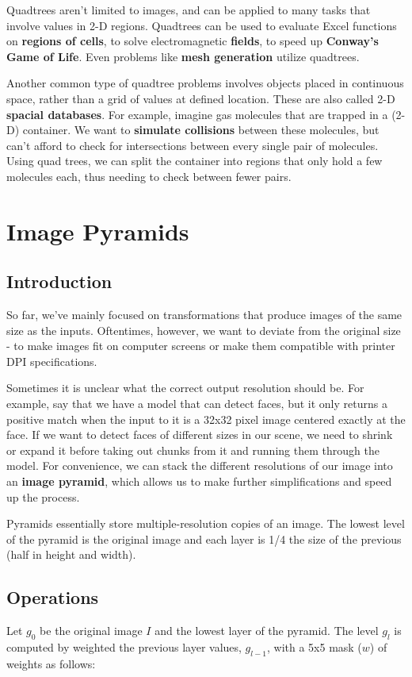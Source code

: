 \documentclass{article}
\begin{document}
Quadtrees aren't limited to images, and can be applied to many tasks that involve values in 2-D regions. Quadtrees can be used to evaluate Excel functions on \textbf{regions of cells}, to solve electromagnetic \textbf{fields}, to speed up \textbf{Conway's Game of Life}. Even problems like \textbf{mesh generation} utilize quadtrees.

Another common type of quadtree problems involves objects placed in continuous space, rather than a grid of values at defined location. These are also called 2-D \textbf{spacial databases}. For example, imagine gas molecules that are trapped in a (2-D) container. We want to \textbf{simulate collisions} between these molecules, but can't afford to check for intersections between every single pair of molecules. Using quad trees, we can split the container into regions that only hold a few molecules each, thus needing to check between fewer pairs.

\section{Image Pyramids}

\subsection{Introduction}

So far, we've mainly focused on transformations that produce images of the same size as the inputs. Oftentimes, however, we want to deviate from the original size - to make images fit on computer screens or make them compatible with printer DPI specifications.

Sometimes it is unclear what the correct output resolution should be. For example, say that we have a model that can detect faces, but it only returns a positive match when the input to it is a 32x32 pixel image centered exactly at the face. If we want to detect faces of different sizes in our scene, we need to shrink or expand it before taking out chunks from it and running them through the model. For convenience, we can stack the different resolutions of our image into an \textbf{image pyramid}, which allows us to make further simplifications and speed up the process.

Pyramids essentially store multiple-resolution copies of an image.  The lowest level of the pyramid is the original image and each layer is 1/4 the size of the previous (half in height and width). 

\subsection{Operations}
Let $g_0$ be the original image $I$ and the lowest layer of the pyramid.  The level $g_l$ is computed by weighted the previous layer values, $g_{l-1}$, with a 5x5 mask ($w$) of weights as follows:
\end{document}
